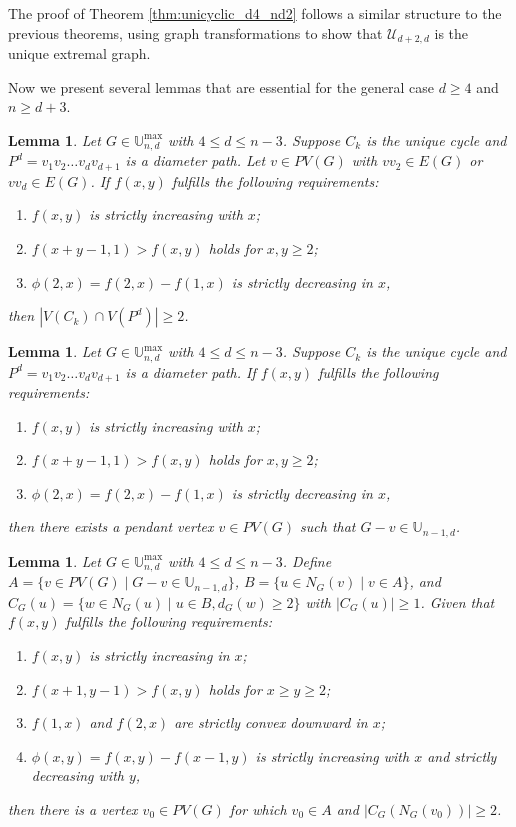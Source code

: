 \documentclass[12pt]{article}
\newtheorem{lemma}[theorem]{Lemma}
\theoremstyle{definition}
\newcommand{\UU}{\mathbb{U}}
\begin{document}
The proof of Theorem \ref{thm:unicyclic_d4_nd2} follows a similar structure to the previous theorems, using graph transformations to show that \(\mathcal{U}_{d+2,d}\) is the unique extremal graph.

Now we present several lemmas that are essential for the general case \(d \geq 4\) and \(n \geq d+3\).

\begin{lemma}
\label{lem:pendant_existence}
Let \(G \in \UU_{n,d}^{\max}\) with \(4 \leq d \leq n-3\). Suppose \(C_k\) is the unique cycle and \(P^d = v_1v_2\ldots v_d v_{d+1}\) is a diameter path. Let \(v \in PV(G)\) with \(v v_2 \in E(G)\) or \(v v_d \in E(G)\). If \(f(x,y)\) fulfills the following requirements:
\begin{enumerate}[label=(\roman*)]
\item \(f(x,y)\) is strictly increasing with \(x\);
\item \(f(x+y-1,1) > f(x,y)\) holds for \(x,y \geq 2\);
\item \(\phi(2,x) = f(2,x) - f(1,x)\) is strictly decreasing in \(x\),
\end{enumerate}
then \(|V(C_k) \cap V(P^d)| \geq 2\).
\end{lemma}

\begin{lemma}
\label{lem:pendant_nonempty}
Let \(G \in \UU_{n,d}^{\max}\) with \(4 \leq d \leq n-3\). Suppose \(C_k\) is the unique cycle and \(P^d = v_1v_2\ldots v_d v_{d+1}\) is a diameter path. If \(f(x,y)\) fulfills the following requirements:
\begin{enumerate}[label=(\roman*)]
\item \(f(x,y)\) is strictly increasing with \(x\);
\item \(f(x+y-1,1) > f(x,y)\) holds for \(x,y \geq 2\);
\item \(\phi(2,x) = f(2,x) - f(1,x)\) is strictly decreasing in \(x\),
\end{enumerate}
then there exists a pendant vertex \(v \in PV(G)\) such that \(G - v \in \UU_{n-1,d}\).
\end{lemma}

\begin{lemma}
\label{lem:main_lemma}
Let \(G \in \UU_{n,d}^{\max}\) with \(4 \leq d \leq n-3\). Define \(A = \{v \in PV(G) \mid G - v \in \UU_{n-1,d}\}\), \(B = \{u \in N_G(v) \mid v \in A\}\), and \(C_G(u) = \{w \in N_G(u) \mid u \in B, d_G(w) \geq 2\}\) with \(|C_G(u)| \geq 1\). Given that \(f(x,y)\) fulfills the following requirements:
\begin{enumerate}[label=(\roman*)]
\item \(f(x,y)\) is strictly increasing in \(x\);
\item \(f(x+1,y-1) > f(x,y)\) holds for \(x \geq y \geq 2\);
\item \(f(1,x)\) and \(f(2,x)\) are strictly convex downward in \(x\);
\item \(\phi(x,y) = f(x,y) - f(x-1,y)\) is strictly increasing with \(x\) and strictly decreasing with \(y\),
\end{enumerate}
then there is a vertex \(v_0 \in PV(G)\) for which \(v_0 \in A\) and \(|C_G(N_G(v_0))| \geq 2\).
\end{lemma}
\end{document}
